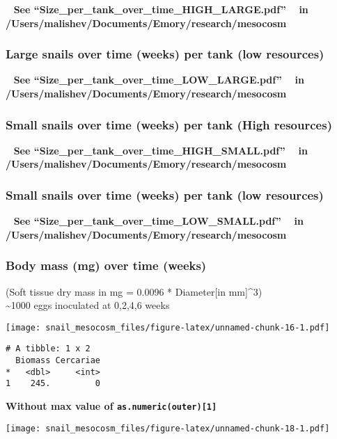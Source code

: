 \documentclass[10,portrait]{article}
\begin{document}
~ \textbf{See ``Size\_per\_tank\_over\_time\_HIGH\_LARGE.pdf'' ~ in
/Users/malishev/Documents/Emory/research/mesocosm}

\subsubsection{Large snails over time (weeks) per tank (low
resources)}\label{large-snails-over-time-weeks-per-tank-low-resources}

~ \textbf{See ``Size\_per\_tank\_over\_time\_LOW\_LARGE.pdf'' ~ in
/Users/malishev/Documents/Emory/research/mesocosm}

\subsubsection{Small snails over time (weeks) per tank (High
resources)}\label{small-snails-over-time-weeks-per-tank-high-resources}

~ \textbf{See ``Size\_per\_tank\_over\_time\_HIGH\_SMALL.pdf'' ~ in
/Users/malishev/Documents/Emory/research/mesocosm}

\subsubsection{Small snails over time (weeks) per tank (low
resources)}\label{small-snails-over-time-weeks-per-tank-low-resources}

~ \textbf{See ``Size\_per\_tank\_over\_time\_LOW\_SMALL.pdf'' ~ in
/Users/malishev/Documents/Emory/research/mesocosm}

\subsubsection{Body mass (mg) over time
(weeks)}\label{body-mass-mg-over-time-weeks}

(Soft tissue dry mass in mg = 0.0096 * Diameter{[}in mm{]}\^{}3)\\
\textasciitilde{}1000 eggs inoculated at 0,2,4,6 weeks

\texttt{[image: snail\_mesocosm\_files/figure-latex/unnamed-chunk-16-1.pdf]}

\begin{verbatim}
# A tibble: 1 x 2
  Biomass Cercariae
*   <dbl>     <int>
1    245.         0
\end{verbatim}

\textbf{Without max value of \texttt{as.numeric(outer){[}1{]}}}

\texttt{[image: snail\_mesocosm\_files/figure-latex/unnamed-chunk-18-1.pdf]}
\end{document}
